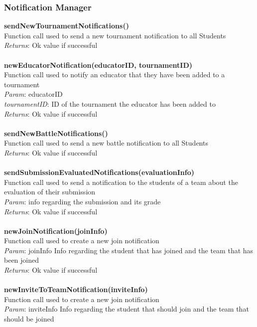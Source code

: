 \documentclass{article}
\begin{document}
\subsubsection{Notification Manager}
\textbf{sendNewTournamentNotifications()}\\
Function call used to send a new tournament notification to all Students\\
\textit{Returns}: Ok value if successful\\
\\
\textbf{newEducatorNotification(educatorID, tournamentID)}\\
Function call used to notify an educator that they have been added to a tournament\\
\textit{Param}: educatorID\\
\textit{tournamentID}: ID of the tournament the educator has been added to\\
\textit{Returns}: Ok value if successful\\
\\
\textbf{sendNewBattleNotifications()}\\
Function call used to send a new battle notification to all Students\\
\textit{Returns}: Ok value if successful\\
\\
\textbf{sendSubmissionEvaluatedNotifications(evaluationInfo)}\\
Function call used to send a notification to the students of a team about the evaluation of their submission\\
\textit{Param}: info regarding the submission and its grade\\
\textit{Returns}: Ok value if successful\\
\\
\textbf{newJoinNotification(joinInfo)}\\
Function call used to create a new join notification\\
\textit{Param}: joinInfo Info regarding the student that has joined and the team that has been joined\\
\textit{Returns}: Ok value if successful\\
\\
\textbf{newInviteToTeamNotification(inviteInfo)}\\
Function call used to create a new join notification\\
\textit{Param}: inviteInfo  Info regarding the student that should join and the team that should be joined\\
\end{document}
